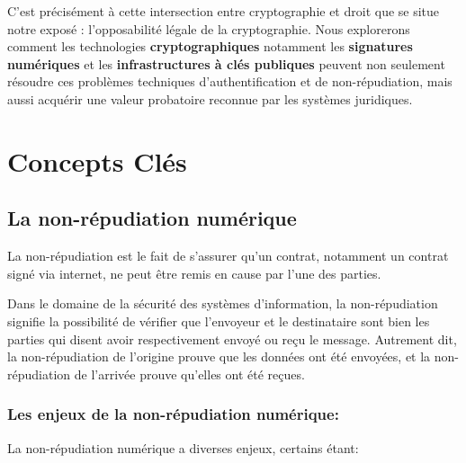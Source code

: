 \documentclass[11pt]{article}
\begin{document}
C'est précisément à cette intersection entre cryptographie et droit que se situe notre exposé : l'opposabilité légale de la cryptographie. Nous explorerons comment les technologies \textbf{cryptographiques} notamment les \textbf{ signatures numériques} et les \textbf{infrastructures à clés publiques}  peuvent non seulement résoudre ces problèmes techniques d'authentification et de non-répudiation, mais aussi acquérir une valeur probatoire reconnue par les systèmes juridiques.
\newpage
\section{Concepts Clés}


\subsection{La non-répudiation numérique}


La non-répudiation est le fait de s'assurer qu'un contrat, notamment un contrat signé via internet, ne peut être remis en cause par l'une des parties. 

Dans le domaine de la sécurité des systèmes d'information, la non-répudiation signifie la possibilité de vérifier que l'envoyeur et le destinataire sont bien les parties qui disent avoir respectivement envoyé ou reçu le message. Autrement dit, la non-répudiation de l'origine prouve que les données ont été envoyées, et la non-répudiation de l'arrivée prouve qu'elles ont été reçues.

\subsubsection{Les enjeux de la non-répudiation numérique:}

La non-répudiation numérique a diverses enjeux, certains étant: 
\end{document}
